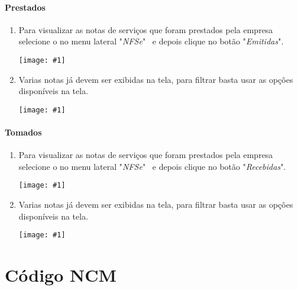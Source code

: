 \documentclass{article}
\newcommand{\imagem}[2]{
  \begin{center}
    \texttt{[image: \#1]}
  \end{center}
}
\newcommand{\parte}[1]{
  \pagebreak
  \vfill
  \partfont{\centering}
  \vspace*{\fill}
    \part{#1}    
  \vspace*{\fill}
  \vfill
  \pagebreak
}
\begin{document}
\subsection{Prestados}
\begin{enumerate}
  \item Para visualizar as notas de serviços que foram prestados pela empresa selecione o no menu lateral "\textit{NFSe}" \ e depois clique no botão "\textit{Emitidas}". \imagem{menu-nfe.PNG}{.2}
  \item Varias notas já devem ser exibidas na tela, para filtrar basta usar as opções disponíveis na tela. \imagem{filtro-nfse-emit.PNG}{.9}
\end{enumerate}

\subsection{Tomados}
\begin{enumerate}
  \item Para visualizar as notas de serviços que foram prestados pela empresa selecione o no menu lateral "\textit{NFSe}" \ e depois clique no botão "\textit{Recebidas}". \imagem{menu-nfe.PNG}{.2}
  \item Varias notas já devem ser exibidas na tela, para filtrar basta usar as opções disponíveis na tela. \imagem{filtro-nfse-rec.PNG}{.9}
\end{enumerate}

\parte{Código NCM}
\end{document}
